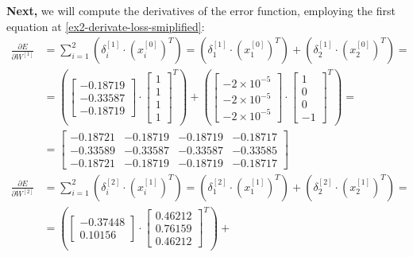 \documentclass[12pt]{article}
\begin{document}
\begin{enumerate}[leftmargin=\labelsep]
        \textbf{Next,} we will compute the derivatives of the error function, employing the first equation at \eqref{ex2-derivate-loss-smiplified}:
        \begingroup
        \allowdisplaybreaks
          \begin{align*}
            \frac{\partial E}{\partial W^{[1]}} &= \sum_{i=1}^{2} \left(\delta^{[1]}_i \cdot \left(x^{[0]}_i\right)^{T}\right)
             = \left(\delta^{[1]}_1 \cdot \left(x^{[0]}_1\right)^{T}\right) + \left(\delta^{[1]}_2 \cdot \left(x^{[0]}_2\right)^{T}\right) = \\
             &= \left(\begin{bmatrix} -0.18719 \\ -0.33587 \\ -0.18719 \end{bmatrix} \cdot \begin{bmatrix} 1 \\ 1 \\ 1 \\ 1\end{bmatrix}^{T}\right) +
                 \left(\begin{bmatrix} -2 \times 10^{-5} \\ -2 \times 10^{-5} \\ -2 \times 10^{-5}  \end{bmatrix} \cdot \begin{bmatrix} 1 \\ 0 \\ 0 \\ -1\end{bmatrix}^{T}\right) = \\
             &= \begin{bmatrix} -0.18721 & -0.18719 & -0.18719 & -0.18717\\ -0.33589 & -0.33587 & -0.33587 & -0.33585 \\ -0.18721 & -0.18719 & -0.18719 & -0.18717\end{bmatrix} \\
            \frac{\partial E}{\partial W^{[2]}} &= \sum_{i=1}^{2} \left(\delta^{[2]}_i \cdot \left(x^{[1]}_i\right)^{T}\right)
             = \left(\delta^{[2]}_1 \cdot \left(x^{[1]}_1\right)^{T}\right) + \left(\delta^{[2]}_2 \cdot \left(x^{[1]}_2\right)^{T}\right) = \\
             &= \left(\begin{bmatrix} -0.37448 \\ 0.10156 \end{bmatrix} \cdot \begin{bmatrix} 0.46212 \\ 0.76159 \\ 0.46212\end{bmatrix}^{T}\right) +

\end{align*}
\end{enumerate}
\end{document}
